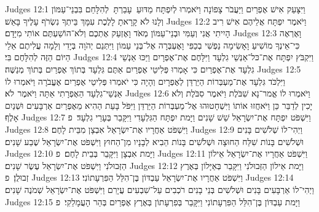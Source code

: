 Judges 12:1	וַיִּצָּעֵק אִישׁ אֶפְרַיִם וַיַּעֲבֹר צָפוֹנָה וַיֹּאמְרוּ לְיִפְתָּח מַדּוּעַ  עָבַרְתָּ  לְהִלָּחֵם בִּבְנֵי־עַמּוֹן וְלָנוּ לֹא קָרָאתָ לָלֶכֶת עִמָּךְ בֵּיתְךָ נִשְׂרֹף עָלֶיךָ בָּאֵשׁ׃
Judges 12:2	וַיֹּאמֶר יִפְתָּח אֲלֵיהֶם אִישׁ רִיב הָיִיתִי אֲנִי וְעַמִּי וּבְנֵי־עַמּוֹן מְאֹד וָאֶזְעַק אֶתְכֶם וְלֹא־הוֹשַׁעְתֶּם אוֹתִי מִיָּדָם׃
Judges 12:3	וָאֶרְאֶה כִּי־אֵינְךָ מוֹשִׁיעַ וָאָשִׂימָה נַפְשִׁי בְכַפִּי וָאֶעְבְּרָה אֶל־בְּנֵי עַמּוֹן וַיִּתְּנֵם יְהֹוָה בְּיָדִי וְלָמָה עֲלִיתֶם אֵלַי הַיּוֹם הַזֶּה לְהִלָּחֶם בִּי׃
Judges 12:4	וַיִּקְבֹּץ יִפְתָּח אֶת־כּל־אַנְשֵׁי גִלְעָד וַיִּלָּחֶם אֶת־אֶפְרָיִם וַיַּכּוּ אַנְשֵׁי גִלְעָד אֶת־אֶפְרַיִם כִּי אָמְרוּ פְּלִיטֵי אֶפְרַיִם אַתֶּם גִּלְעָד בְּתוֹךְ אֶפְרַיִם בְּתוֹךְ מְנַשֶּׁה׃
Judges 12:5	וַיִּלְכֹּד גִּלְעָד אֶת־מַעְבְּרוֹת הַיַּרְדֵּן לְאֶפְרָיִם וְהָיָה כִּי יֹאמְרוּ פְּלִיטֵי אֶפְרַיִם אֶעֱבֹרָה וַיֹּאמְרוּ לוֹ אַנְשֵׁי־גִלְעָד הַאֶפְרָתִי אַתָּה וַיֹּאמֶר  לֹא׃
Judges 12:6	וַיֹּאמְרוּ לוֹ אֱמר־נָא שִׁבֹּלֶת וַיֹּאמֶר סִבֹּלֶת וְלֹא יָכִין לְדַבֵּר כֵּן וַיֹּאחֲזוּ אוֹתוֹ וַיִּשְׁחָטוּהוּ אֶל־מַעְבְּרוֹת הַיַּרְדֵּן וַיִּפֹּל בָּעֵת הַהִיא מֵאֶפְרַיִם אַרְבָּעִים וּשְׁנַיִם אָלֶף׃
Judges 12:7	וַיִּשְׁפֹּט יִפְתָּח אֶת־יִשְׂרָאֵל שֵׁשׁ שָׁנִים וַיָּמת יִפְתָּח הַגִּלְעָדִי וַיִּקָּבֵר בְּעָרֵי גִלְעָד׃ {פ}
Judges 12:8	וַיִּשְׁפֹּט אַחֲרָיו אֶת־יִשְׂרָאֵל אִבְצָן מִבֵּית לָחֶם׃
Judges 12:9	וַיְהִי־לוֹ שְׁלֹשִׁים בָּנִים וּשְׁלֹשִׁים בָּנוֹת שִׁלַּח הַחוּצָה וּשְׁלֹשִׁים בָּנוֹת הֵבִיא לְבָנָיו מִן־הַחוּץ וַיִּשְׁפֹּט אֶת־יִשְׂרָאֵל שֶׁבַע שָׁנִים׃
Judges 12:10	וַיָּמת אִבְצָן וַיִּקָּבֵר בְּבֵית לָחֶם׃ {פ}
Judges 12:11	וַיִּשְׁפֹּט אַחֲרָיו אֶת־יִשְׂרָאֵל אֵילוֹן הַזְּבוּלֹנִי וַיִּשְׁפֹּט אֶת־יִשְׂרָאֵל עֶשֶׂר שָׁנִים׃
Judges 12:12	וַיָּמת אֵילוֹן הַזְּבוּלֹנִי וַיִּקָּבֵר בְּאַיָּלוֹן בְּאֶרֶץ זְבוּלֻן׃ {פ}
Judges 12:13	וַיִּשְׁפֹּט אַחֲרָיו אֶת־יִשְׂרָאֵל עַבְדּוֹן בֶּן־הִלֵּל הַפִּרְעָתוֹנִי׃
Judges 12:14	וַיְהִי־לוֹ אַרְבָּעִים בָּנִים וּשְׁלֹשִׁים בְּנֵי בָנִים רֹכְבִים עַל־שִׁבְעִים עֲיָרִם וַיִּשְׁפֹּט אֶת־יִשְׂרָאֵל שְׁמֹנֶה שָׁנִים׃
Judges 12:15	וַיָּמת עַבְדּוֹן בֶּן־הִלֵּל הַפִּרְעָתוֹנִי וַיִּקָּבֵר בְּפִרְעָתוֹן בְּאֶרֶץ אֶפְרַיִם בְּהַר הָעֲמָלֵקִי׃ {פ}
